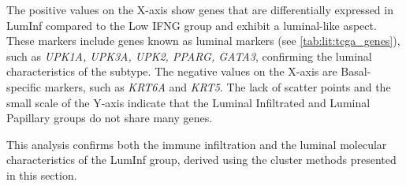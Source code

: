 The positive values on the X-axis show genes that are differentially expressed in LumInf compared to the Low IFNG group and exhibit a luminal-like aspect. These markers include genes known as luminal markers (see \cref{tab:lit:tcga_genes}), such as \textit{UPK1A, UPK3A, UPK2, PPARG, GATA3}, confirming the luminal characteristics of the subtype. The negative values on the X-axis are Basal-specific markers, such as \textit{KRT6A} and \textit{KRT5}. The lack of scatter points and the small scale of the Y-axis indicate that the Luminal Infiltrated and Luminal Papillary groups do not share many genes.

This analysis confirms both the immune infiltration and the luminal molecular characteristics of the LumInf group, derived using the cluster methods presented in this section.

